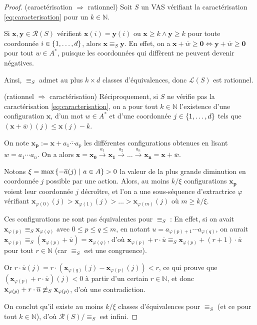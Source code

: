 \documentclass[a4paper,final]{article}
\theoremstyle{definition}
\let\phi\varphi
\let\leq\leqslant
\let\geq\geqslant
\newcommand{\set}[2]{\left\{#1\mathrel{\left|\vphantom{#1}\vphantom{#2}\right.}#2\right\}}
\newcommand{\os}[1]{\left\{\mathinner{#1}\right\}}
\newcommand{\N}{\ensuremath{\mathbb{N}}}
\newcommand{\lang}{\ensuremath{\mathcal{L}}}
\newcommand{\conf}{\ensuremath{\mathcal{R}}}
\newcommand{\trans}[2]{\ensuremath{\stackrel{#1}{\longrightarrow}_{#2}}}
\newcommand{\vect}[1]{\ensuremath{\mathbf{#1}}}
\newcommand{\rel}{\ensuremath{\equiv}}
\newcommand{\equivaut}{\ensuremath{\Leftrightarrow}}
\newcommand{\valeur}[1]{\ensuremath{\overline{#1}}}
\begin{document}
\begin{proof}
(caractérisation $\Rightarrow$ rationnel)
Soit $S$ un VAS vérifiant la caractérisation \eqref{eq:caracterisation} pour un $k\in\N$.

Si $\vect{x},\vect{y}\in\conf(S)$ vérifient 
$\vect{x}(i)=\vect{y}(i)$ ou $\vect{x}\geq k \land \vect{y}\geq k$
pour toute coordonnée $i\in\os{1,\dots,d}$, alors $\vect{x}\rel_S \vect{y}$. 
En effet, on a $\vect{x} +\valeur{w} \geq\vect{0} \equivaut \vect{y} +\valeur{w} \geq\vect{0}$ pour tout $w\in A^\ast$, 
puisque les coordonnées qui diffèrent ne peuvent devenir négatives.

Ainsi, $\rel_S$ admet au plus $k\times d$ classes d'équivalences, donc $\lang(S)$ est rationnel.

\vspace{2mm}\noindent
(rationnel $\Rightarrow$ caractérisation)
Réciproquement, si $S$ ne vérifie pas la caractérisation \eqref{eq:caracterisation}, 
on a pour tout $k\in\N$ l'existence d'une configuration $\vect{x}$, d'un mot $w\in A^\ast$ et d'une coordonnée $j\in\os{1,\dots,d}$ tels que $(\vect{x} +\valeur{w})(j)\leq \vect{x}(j)-k$.

On note $\vect{x_p}:=\vect{x} +\valeur{a_1\cdots a_p}$ les différentes configurations obtenues en lisant $w=a_1\cdots a_n$.
On a alors $\vect{x}=\vect{x_0} \trans{a_1}{}\vect{x_1} \trans{a_2}{}\dots \trans{a_n}{}\vect{x_n}= \vect{x} +\valeur{w}$.

Notons $\xi = \text{max}\set{-\valeur{a}(j)} {a\in A} >0$ la valeur de la plus grande diminution en coordonnée $j$ possible par une action.
Alors, au moins $k/\xi$ configurations $\vect{x_p}$ voient leur coordonnée $j$ décroître,
et l'on a une sous-séquence d'extractrice $\phi$ vérifiant $\vect{x}_{\phi(0)}(j)>\vect{x}_{\phi(1)}(j)>\dots>\vect{x}_{\phi(m)}(j)$ où $m\geq k/\xi$.

Ces configurations ne sont pas équivalentes pour $\rel_S$ :
En effet, si on avait $\vect{x}_{\phi(p)}\rel_S \vect{x}_{\phi(q)}$ avec $0\leq p\leq q\leq m$, en notant $u=a_{\phi(p)+1}\cdots a_{\phi(q)}$, 
on aurait $\vect{x}_{\phi(p)}\rel_S (\vect{x}_{\phi(p)} +\valeur{u})=\vect{x}_{\phi(q)}$, d'où $\vect{x}_{\phi(p)}+r\cdot \valeur{u}\rel_S \vect{x}_{\phi(p)}+(r+1)\cdot \valeur{u}$ pour tout $r\in\N$ (car $\rel_S$ est une congruence).

Or $r\cdot\valeur{u}(j) =r\cdot(\vect{x}_{\phi(q)}(j) -\vect{x}_{\phi(p)}(j)) <r$, ce qui prouve que $(\vect{x}_{\phi(p)}+r\cdot \valeur{u})(j)<0$ à partir d'un certain $r\in\N$, et donc $\vect{x}_{\phi(p)}+r\cdot \valeur{u} \not\rel_S \vect{x}_{\phi(p)}$, d'où une contradiction.

On conclut qu'il existe au moins $k/\xi$ classes d'équivalences pour $\rel_S$ (et ce pour tout $k\in\N$), d'où $\conf(S)/\rel_S$ est infini.
\end{proof}
\end{document}

